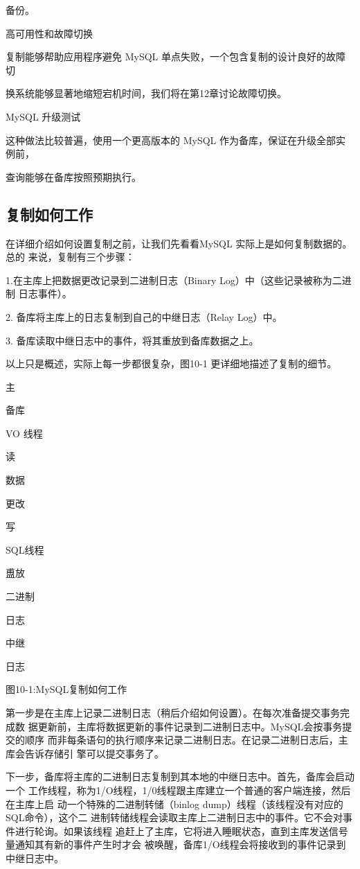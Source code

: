 备份。

高可用性和故障切换

复制能够帮助应用程序避免 MySQL 单点失败，一个包含复制的设计良好的故障切

换系统能够显著地缩短宕机时间，我们将在第12章讨论故障切换。

MySQL 升级测试

这种做法比较普遍，使用一个更高版本的 MySQL 作为备库，保证在升级全部实例前，

查询能够在备库按照预期执行。

\subsection{复制如何工作}
在详细介绍如何设置复制之前，让我们先看看MySQL 实际上是如何复制数据的。总的
来说，复制有三个步骤：

1.在主库上把数据更改记录到二进制日志（Binary Log）中（这些记录被称为二进制
日志事件）。

2. 备库将主库上的日志复制到自己的中继日志（Relay Log）中。

3. 备库读取中继日志中的事件，将其重放到备库数据之上。

以上只是概述，实际上每一步都很复杂，图10-1 更详细地描述了复制的细节。

主

备库

VO 线程

读

数据

更改

写

SQL线程

盙放

二进制

日志

中继

日志

图10-1:MySQL复制如何工作

第一步是在主库上记录二进制日志（稍后介绍如何设置）。在每次准备提交事务完成数
据更新前，主库将数据更新的事件记录到二进制日志中。MySQL会按事务提交的顺序
而非每条语句的执行顺序来记录二进制日志。在记录二进制日志后，主库会告诉存储引
擎可以提交事务了。

下一步，备库将主库的二进制日志复制到其本地的中继日志中。首先，备库会启动一个
工作线程，称为1/O线程，1/0线程跟主库建立一个普通的客户端连接，然后在主库上启
动一个特殊的二进制转储（binlog dump）线程（该线程没有对应的SQL命令），这个二
进制转储线程会读取主库上二进制日志中的事件。它不会对事件进行轮询。如果该线程
追赶上了主库，它将进入睡眠状态，直到主库发送信号量通知其有新的事件产生时才会
被唤醒，备库1/O线程会将接收到的事件记录到中继日志中。

